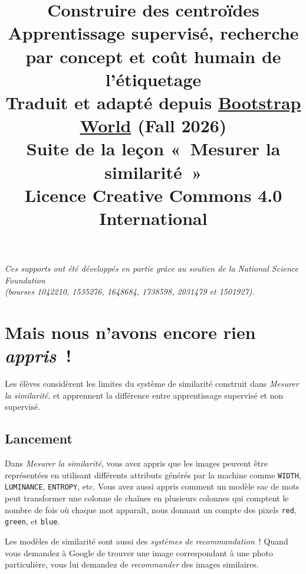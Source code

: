 \documentclass[12pt,a4paper]{article}
\title{%
  \vspace{-2cm}
  {\Huge\bfseries Construire des centroïdes}\\[0.5em]
  {\large Apprentissage supervisé, recherche par concept et coût humain de l'étiquetage}\\[1em]
  {\normalsize Traduit et adapté depuis \href{https://www.bootstrapworld.org/materials/fall2026/en-us/lessons/measuring-similarity-2/}{Bootstrap World} (Fall 2026)}\\
  {\normalsize Suite de la leçon «~Mesurer la similarité~»}\\[0.5em]
  {\normalsize Licence Creative Commons 4.0 International}
}
\date{}
\author{}
\begin{document}
\maketitle
\thispagestyle{empty}

\vspace{2cm}
\begin{center}
  \textit{Ces supports ont été développés en partie grâce au soutien de la National Science Foundation\\
  (bourses 1042210, 1535276, 1648684, 1738598, 2031479 et 1501927).}
\end{center}

\newpage
\tableofcontents
\newpage

\section[Nous n'avons encore rien appris]{Mais nous n'avons encore rien \emph{appris}~!}

\begin{overviewbox}
  Les élèves considèrent les limites du système de similarité construit dans \emph{Mesurer la similarité}, et apprennent la différence entre apprentissage supervisé et non supervisé.
\end{overviewbox}

\subsection{Lancement}

Dans \emph{Mesurer la similarité}, vous avez appris que les images peuvent être représentées en utilisant différents attributs générés par la machine comme \texttt{WIDTH}, \texttt{LUMINANCE}, \texttt{ENTROPY}, etc. Vous avez aussi appris comment un modèle sac de mots peut transformer une colonne de chaînes en plusieurs colonnes qui comptent le nombre de fois où chaque mot apparaît, nous donnant un compte des pixels \texttt{red}, \texttt{green}, et \texttt{blue}.

Les modèles de similarité sont aussi des \emph{systèmes de recommandation}~! Quand vous demandez à Google de trouver une image correspondant à une photo particulière, vous lui demandez de \emph{recommander} des images similaires.
\end{document}
